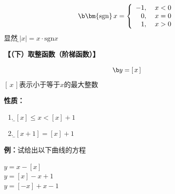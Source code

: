   $${\b \bm{\mathrm{sgn}}\,x =\left\{
	\begin{array}{rl}
	-1,\;&x<0 \\
	0,\;&x=0 \\
	1,\;&x>0
	\end{array}
  \right.}$$
显然，{\b $|x|=x \cdot\mathrm{sgn} x$}
	
{\bf 【（下）取整函数（阶梯函数）】}

  $${\b y=\left[ \,x\, \right]}$$
  $[\,x\,]$表示小于等于$x$的最大整数

{\bf 性质：}
\begin{enumerate}[(1)]
  \setlength{\itemindent}{1cm}
  \item {\b $[x]\leq x<[x]+1$}
  \item {\b $[x+1]=[x]+1$}
\end{enumerate}

{\bf 例：}试给出以下曲线的方程

\begin{center}
	\quad $y=x-[x]$\\

	\quad $y=[x]-x+1$\\

	\quad $y=[-x]+x-1$
\end{center}
	
